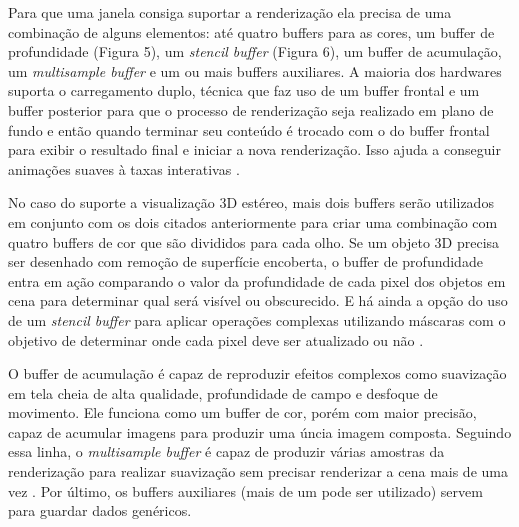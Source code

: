 Para que uma janela consiga suportar a renderização ela precisa de uma combinação de alguns elementos: até quatro buffers para as cores, um buffer de profundidade (Figura 5), um \textit{stencil buffer} (Figura 6), um buffer de acumulação, um \textit{multisample buffer} e um ou mais buffers auxiliares. A maioria dos hardwares suporta o carregamento duplo, técnica que faz uso de um buffer frontal e um buffer posterior para que o processo de renderização seja realizado em plano de fundo e então quando terminar seu conteúdo é trocado com o do buffer frontal para exibir o resultado final e iniciar a nova renderização. Isso ajuda a conseguir animações suaves à taxas interativas \cite{GLSLBook}.

\begin{figure}[h!]
	\centering
\end{figure}
\nocite{stcbuf}
	
No caso do suporte a visualização 3D estéreo, mais dois buffers serão utilizados em conjunto com os dois citados anteriormente para criar uma combinação com quatro buffers de cor que são divididos para cada olho. Se um objeto 3D precisa ser desenhado com remoção de superfície encoberta, o buffer de profundidade entra em ação comparando o valor da profundidade de cada pixel dos objetos em cena para determinar qual será visível ou obscurecido. E há ainda a opção do uso de um \textit{stencil buffer} para aplicar operações complexas utilizando máscaras com o objetivo de determinar onde cada pixel deve ser atualizado ou não \cite{GLSLBook}.

O buffer de acumulação é capaz de reproduzir efeitos complexos como suavização em tela cheia de alta qualidade, profundidade de campo e desfoque de movimento. Ele funciona como um buffer de cor, porém com maior precisão, capaz de acumular imagens para produzir uma úncia imagem composta. Seguindo essa linha, o \textit{multisample buffer} é capaz de produzir várias amostras da renderização para realizar suavização sem precisar renderizar a cena mais de uma vez \cite{GLSLBook}. Por último, os buffers auxiliares (mais de um pode ser utilizado) servem para guardar dados genéricos.

